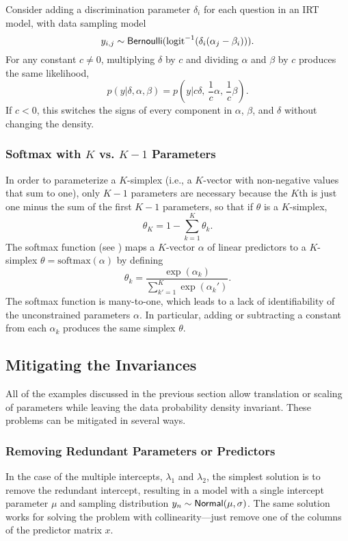 Consider adding a discrimination parameter $\delta_i$ for each
question in an IRT model, with data sampling model
\[
y_{i,j} \sim \mbox{\sf Bernoulli}(\mbox{logit}^{-1}(\delta_i(\alpha_j - \beta_i))).
\]
For any constant $c \neq 0$, multiplying $\delta$ by $c$ and dividing
$\alpha$ and $\beta$ by $c$ produces the same likelihood,
\[
p(y|\delta,\alpha,\beta)
= p(y|c \delta, \, \frac{1}{c}\alpha, \, \frac{1}{c}\beta).
\]
If $c < 0$, this switches the signs of every component in $\alpha$,
$\beta$, and $\delta$ without changing the density.


\subsubsection{Softmax with $K$ vs. $K-1$ Parameters}

In order to parameterize a $K$-simplex (i.e., a $K$-vector with
non-negative values that sum to one), only $K - 1$ parameters are
necessary because the $K$th is just one minus the sum of the first $K
- 1$ parameters, so that if $\theta$ is a $K$-simplex,
%
\[
\theta_K = 1 - \sum_{k=1}^K \theta_k.
\]
%
The softmax function (see ) maps a $K$-vector
$\alpha$ of linear predictors to a $K$-simplex $\theta =
\mbox{softmax}(\alpha)$ by defining
%
\[
\theta_k = \frac{\exp(\alpha_k)}{\sum_{k'=1}^K \exp(\alpha_k')}.
\]
%
The softmax function is many-to-one, which leads to a lack of
identifiability of the unconstrained parameters $\alpha$.  In
particular, adding or subtracting a constant from each $\alpha_k$
produces the same simplex $\theta$. 



\subsection{Mitigating the Invariances}

All of the examples discussed in the previous section allow
translation or scaling of parameters while leaving the data
probability density invariant.  These problems can be mitigated in
several ways.

\subsubsection{Removing Redundant Parameters or Predictors}

In the case of the multiple intercepts, $\lambda_1$ and $\lambda_2$,
the simplest solution is to remove the redundant intercept, resulting
in a model with a single intercept parameter $\mu$ and sampling
distribution $y_n \sim \mbox{\sf Normal}(\mu, \sigma)$.  The same
solution works for solving the problem with collinearity---just remove
one of the columns of the predictor matrix $x$.

